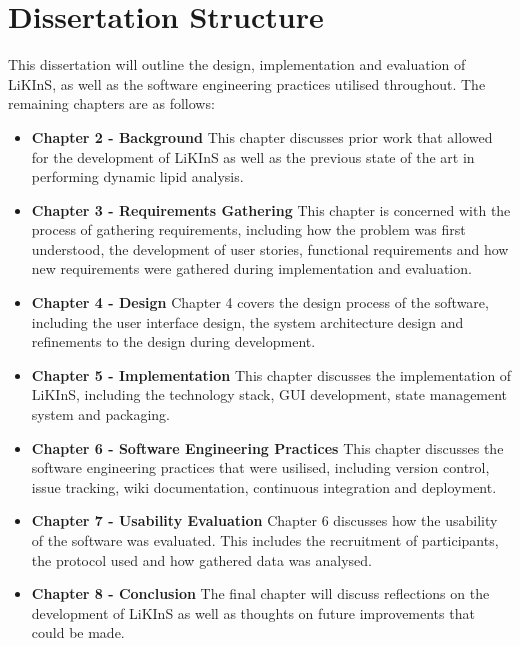 \documentclass{l4proj}
\begin{document}
\section{Dissertation Structure}
This dissertation will outline the design, implementation and evaluation of LiKInS, as well as the software engineering practices utilised throughout. The remaining chapters are as follows:
\begin{itemize}
    \item \textbf{Chapter 2 - Background}\newline
    This chapter discusses prior work that allowed for the development of LiKInS as well as the previous state of the art in performing dynamic lipid analysis.
    \item \textbf{Chapter 3 - Requirements Gathering}\newline
    This chapter is concerned with the process of gathering requirements, including how the problem was first understood, the development of user stories, functional requirements and how new requirements were gathered during implementation and evaluation.
    \item \textbf{Chapter 4 - Design}\newline
    Chapter 4 covers the design process of the software, including the user interface design, the system architecture design and refinements to the design during development.
    \item \textbf{Chapter 5 - Implementation}\newline
    This chapter discusses the implementation of LiKInS, including the technology stack, GUI development, state management system and packaging. 
    \item \textbf{Chapter 6 - Software Engineering Practices}\newline
    This chapter discusses the software engineering practices that were usilised, including version control, issue tracking, wiki documentation, continuous integration and deployment. 
    \item \textbf{Chapter 7 - Usability Evaluation}\newline
    Chapter 6 discusses how the usability of the software was evaluated. This includes the recruitment of participants, the protocol used and how gathered data was analysed.
    \item \textbf{Chapter 8 - Conclusion}\newline
    The final chapter will discuss reflections on the development of LiKInS as well as thoughts on future improvements that could be made.
    
\end{itemize}
\end{document}
